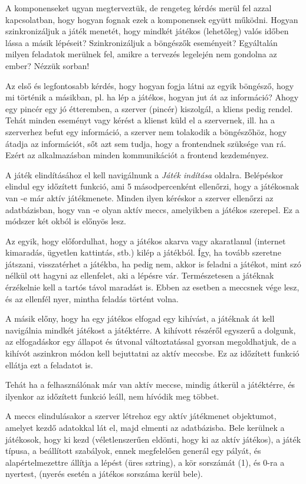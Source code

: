 A komponenseket ugyan megterveztük, de rengeteg kérdés merül fel azzal kapcsolatban, hogy hogyan fognak ezek a komponensek együtt működni. Hogyan szinkronizáljuk a játék menetét, hogy mindkét játékos (lehetőleg) valós időben lássa a másik lépéseit? Szinkronizáljuk a böngészők eseményeit? Egyáltalán milyen feladatok merülnek fel, amikre a tervezés legelején nem gondolna az ember? Nézzük sorban!

Az első és legfontosabb kérdés, hogy hogyan fogja látni az egyik böngésző, hogy mi történik a másikban, pl. ha lép a játékos, hogyan jut át az információ? Ahogy egy pincér egy jó étteremben, a szerver (pincér) kiszolgál, a kliens pedig rendel. Tehát minden eseményt vagy kérést a klienst küld el a szervernek, ill. ha a szerverhez befut egy információ, a szerver nem tolakodik a böngészőhöz, hogy átadja az információt, sőt azt sem tudja, hogy a frontendnek szüksége van rá. Ezért az alkalmazásban minden kommunikációt a frontend kezdeményez.

A játék elindításához el kell navigálnunk a \textit{Játék indítása} oldalra. Belépéskor elindul egy időzített funkció, ami 5 másodpercenként ellenőrzi, hogy a játékosnak van -e már aktív játékmenete. Minden ilyen kéréskor a szerver ellenőrzi az adatbázisban, hogy van -e olyan aktív meccs, amelyikben a játékos szerepel. Ez a módszer két okból is előnyös lesz.

Az egyik, hogy előfordulhat, hogy a játékos akarva vagy akaratlanul (internet kimaradás, ügyetlen kattintás, stb.) kilép a játékból. Így, ha tovább szeretne játszani, visszatérhet a játékba, ha pedig nem, akkor is feladni a játékot, mint szó nélkül ott hagyni az ellenfelet, aki a lépésre vár. Természetesen a játéknak érzékelnie kell a tartós távol maradást is. Ebben az esetben a meccsnek vége lesz, és az ellenfél nyer, mintha feladás történt volna.

A másik előny, hogy ha egy játékos elfogad egy kihívást, a játéknak át kell navigálnia mindkét játékost a játéktérre. A kihívott részéről egyszerű a dolgunk, az elfogadáskor egy állapot és útvonal változtatással gyorsan megoldhatjuk, de a kihívót aszinkron módon kell bejuttatni az aktív meccsbe. Ez az időzített funkció ellátja ezt a feladatot is.

Tehát ha a felhasználónak már van aktív meccse, mindig átkerül a játéktérre, és ilyenkor az időzített funkció leáll, nem hívódik meg többet.

A meccs elindulásakor a szerver létrehoz egy aktív játékmenet objektumot, amelyet kezdő adatokkal lát el, majd elmenti az adatbázisba. Bele kerülnek a játékosok, hogy ki kezd (véletlenszerűen eldönti, hogy ki az aktív játékos), a játék típusa, a beállított szabályok, ennek megfelelően generál egy pályát, és alapértelmezettre állítja a lépést (üres sztring), a kör sorszámát (1), és 0-ra a nyertest, (nyerés esetén a játékos sorszáma kerül bele).

